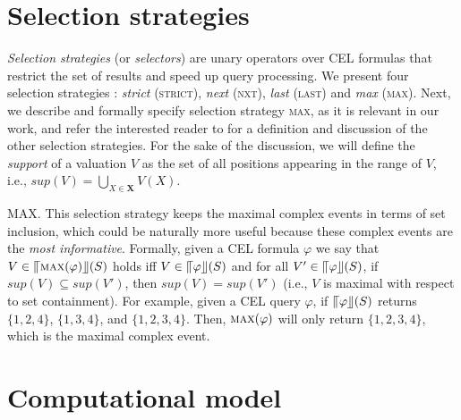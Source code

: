 \section{Selection strategies}\label{sec:selection_strategies}

\emph{Selection strategies} (or \emph{selectors}) are unary operators over CEL formulas that restrict the set of results and speed up query processing. We present four selection strategies \cite{formal-framework-cep,formal-framework-cer}: \emph{strict} (\textsc{strict}), \emph{next} (\textsc{nxt}), \emph{last} (\textsc{last}) and \emph{max} (\textsc{max}). Next, we describe and formally specify selection strategy \textsc{max}, as it is relevant in our work, and refer the interested reader to \cite{formal-framework-cer} for a definition and discussion of the other selection strategies. For the sake of the discussion, we will define the \emph{support} of a valuation $V$ as the set of all positions appearing in the range of $V$, i.e., $sup(V) = \bigcup\limits_{X \in \textbf{X}}V(X)$.

\textsc{MAX}. This selection strategy keeps the maximal complex events in terms of set inclusion, which could be naturally more useful because these complex events are the \emph{most informative}. Formally, given a CEL formula $\varphi$ we say that $V \in \llceil \textsc{max}(\varphi) \rrfloor(S)$ holds iff $V \in \llceil \varphi \rrfloor(S)$ and for all $V' \in \llceil \varphi \rrfloor(S)$, if $sup(V) \subseteq sup(V')$, then $sup(V) = sup(V')$ (i.e., $V$ is maximal with respect to set containment). For example, given a CEL query $\varphi$, if $\llceil \varphi \rrfloor(S)$ returns $\{ 1,2,4\}$, $\{1,3,4\}$, and $\{1,2,3,4\}$. Then, $\textsc{max}(\varphi)$ will only return $\{ 1, 2, 3, 4\}$, which is the maximal complex event.

\section{Computational model}\label{sec:cea}

